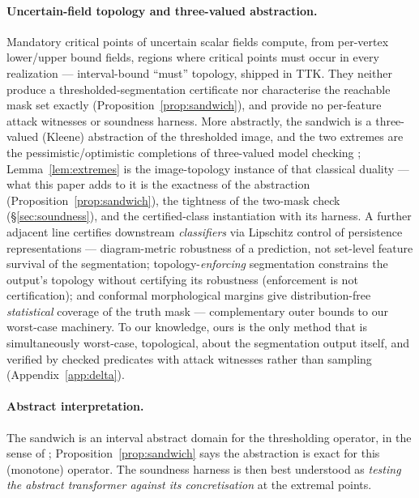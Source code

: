 \documentclass[10pt]{article}
\begin{document}
\paragraph{Uncertain-field topology and three-valued abstraction.}
Mandatory critical points of uncertain scalar fields
\citep{gunther2014mandatory} compute, from per-vertex lower/upper bound
fields, regions where critical points must occur in every realization ---
interval-bound ``must'' topology, shipped in TTK. They neither produce a
thresholded-segmentation certificate nor characterise the reachable mask
set exactly (Proposition~\ref{prop:sandwich}), and provide no per-feature
attack witnesses or soundness harness. More abstractly, the sandwich is a
three-valued (Kleene) abstraction of the thresholded image, and the two
extremes are the pessimistic/optimistic completions of three-valued model
checking \citep{bruns1999threevalued}; Lemma~\ref{lem:extremes} is the
image-topology instance of that classical duality --- what this paper
adds to it is the exactness of the abstraction
(Proposition~\ref{prop:sandwich}), the tightness of the two-mask check
(\S\ref{sec:soundness}), and the certified-class instantiation with its
harness. A further adjacent line certifies downstream \emph{classifiers}
via Lipschitz control of persistence representations
\citep{agerberg2025certifying} --- diagram-metric robustness of a
prediction, not set-level feature survival of the segmentation;
topology-\emph{enforcing} segmentation \citep{topoguarantee2026}
constrains the output's topology without certifying its robustness
(enforcement is not certification); and conformal morphological margins
\citep{mossina2025conformal} give distribution-free \emph{statistical}
coverage of the truth mask --- complementary outer bounds to our
worst-case machinery. To our knowledge, ours is the only method that is
simultaneously worst-case, topological, about the segmentation output
itself, and verified by checked predicates with attack witnesses rather
than sampling (Appendix~\ref{app:delta}).

\paragraph{Abstract interpretation.} The sandwich is an interval abstract
domain for the thresholding operator, in the sense of \citet{cousot1977};
Proposition~\ref{prop:sandwich} says the abstraction is exact for this
(monotone) operator. The soundness harness is then best understood as
\emph{testing the abstract transformer against its concretisation} at the
extremal points.
\end{document}
